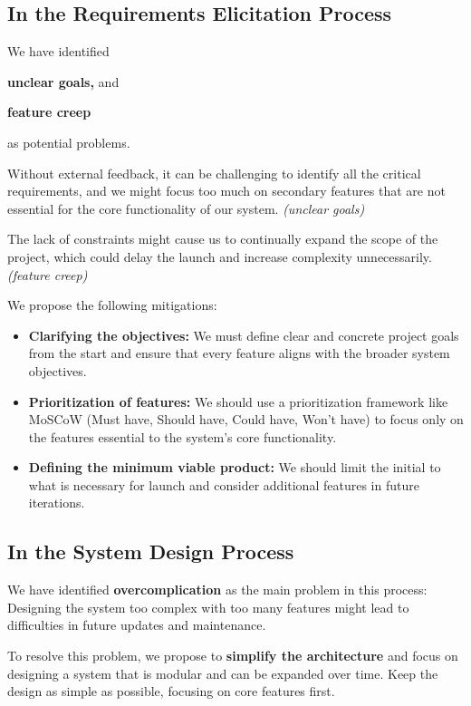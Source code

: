 \documentclass[a4paper,journal]{IEEEtran}
\begin{document}
\subsection{In the Requirements Elicitation Process}
We have identified
\begin{enumerate*}
  \item \textbf{unclear goals,} and
  \item \textbf{feature creep}
\end{enumerate*}
as potential problems.

Without external feedback, it can be challenging to identify all the critical
requirements, and we might focus too much on secondary features that are not
essential for the core functionality of our system.
\textit{(unclear goals)}

The lack of constraints might cause us to continually expand the scope of the
project, which could delay the launch and increase complexity unnecessarily.
\textit{(feature creep)}

We propose the following mitigations:
\begin{itemize}
  \item \textbf{Clarifying the objectives:}
    We must define clear and concrete project goals from the start and ensure that
    every feature aligns with the broader system objectives.
  \item \textbf{Prioritization of features:}
    We should use a
    prioritization framework like MoSCoW (Must have, Should have, Could have,
    Won't have) to focus only on the features essential to the system's core
    functionality.
  \item \textbf{Defining the minimum viable product:}
    We should limit the initial to what is necessary for launch and consider
    additional features in future iterations.
\end{itemize}

\subsection{In the System Design Process}
We have identified \textbf{overcomplication} as the main problem in this
process:
Designing the system too complex with too many features might lead to
difficulties in future updates and maintenance.

To resolve this problem, we propose to \textbf{simplify the architecture} and
focus on designing a system that is modular and can be expanded over time.
Keep the design as simple as possible, focusing on core features first.
\end{document}
